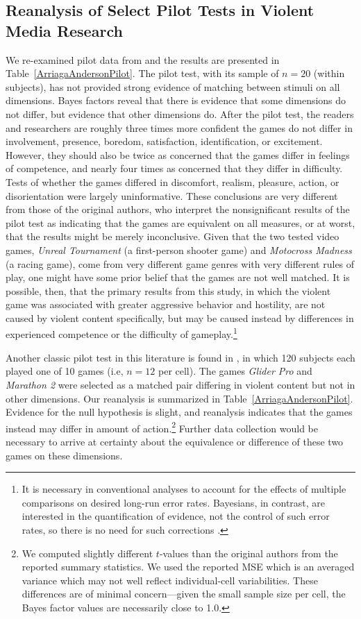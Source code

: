 \documentclass[man]{apa6}
\begin{document}
\subsection{Reanalysis of Select Pilot Tests in Violent Media Research}
We re-examined pilot data from \citet{Arriaga:etal:2008} and the results are presented in Table~\ref{ArriagaAndersonPilot}. The pilot test, with its sample of $n = 20$ (within subjects), has not provided strong evidence of matching between stimuli on all dimensions. Bayes factors reveal that there is evidence that some dimensions do not differ, but evidence that other dimensions do. After the pilot test, the readers and researchers are roughly three times more confident the games do not differ in involvement, presence, boredom, satisfaction, identification, or excitement. However, they should also be twice as concerned that the games differ in feelings of competence, and nearly four times as concerned that they differ in difficulty. Tests of whether the games differed in discomfort, realism, pleasure, action, or disorientation were largely uninformative. These conclusions are very different from those of the original authors, who interpret the nonsignificant results of the pilot test as indicating that the games are equivalent on all measures, or at worst, that the results might be merely inconclusive. Given that the two tested video games, {\em Unreal Tournament} (a first-person shooter game) and {\em Motocross Madness} (a racing game), come from very different game genres with very different rules of play, one might have some prior belief that the games are not well matched.  It is possible, then, that the primary results from this study, in which the violent game was associated with greater aggressive behavior and hostility, 
are not caused by violent content specifically, but may be caused instead by differences in experienced competence or the difficulty of gameplay.\footnote{It is necessary in conventional analyses to account for the effects of multiple comparisons on desired long-run error rates.  Bayesians, in contrast, are interested in the quantification of evidence, not the control of such error rates, so there is no need for such corrections \citep{Royall:1997,Dienes:2011}.}

Another classic pilot test in this literature is found in \citet[study 1]{Anderson:etal:2004}, in which 120 subjects each played one of 10 games (i.e, $n = 12$ per cell). The games {\em Glider Pro} and {\em Marathon 2} were selected as a matched pair differing in violent content but not in other dimensions. Our reanalysis is summarized in Table~\ref{ArriagaAndersonPilot}. Evidence for the null hypothesis is slight, and reanalysis indicates that the games instead may differ in amount of action.\footnote{We computed slightly different $t$-values than the original authors from the reported summary statistics.  We used the reported MSE which is an averaged variance which may not well reflect individual-cell variabilities.    These differences are of minimal concern---given the small sample size per cell, the Bayes factor values are necessarily close to 1.0.} Further data collection would be necessary to arrive at certainty about the equivalence or difference of these two games on these dimensions. 
\end{document}
